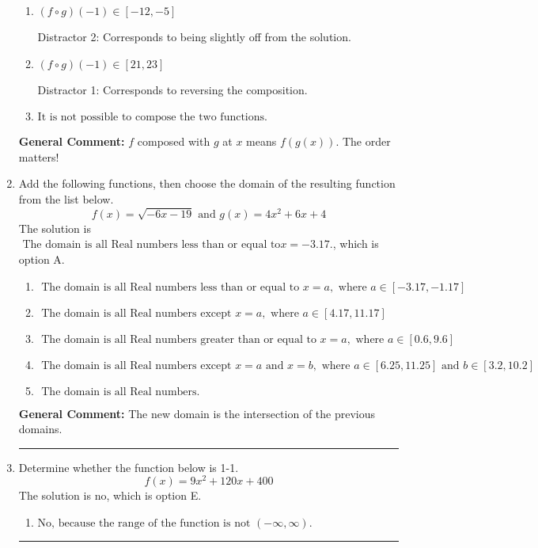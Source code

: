 \documentclass{extbook}[14pt]
\newcommand{\litem}[1]{\item #1

\rule{\textwidth}{0.4pt}}
\begin{document}
\begin{enumerate}
{\begin{enumerate}[label=\Alph*.]
* This is the correct solution
\item \( (f \circ g)(-1) \in [-12, -5] \)

 Distractor 2: Corresponds to being slightly off from the solution.
\item \( (f \circ g)(-1) \in [21, 23] \)

 Distractor 1: Corresponds to reversing the composition.
\item \( \text{It is not possible to compose the two functions.} \)


\end{enumerate}

\textbf{General Comment:} $f$ composed with $g$ at $x$ means $f(g(x))$. The order matters!
}
\litem{
Add the following functions, then choose the domain of the resulting function from the list below.
\[ f(x) = \sqrt{-6x-19}  \text{ and } g(x) = 4x^{2} +6 x + 4 \]The solution is \( \text{ The domain is all Real numbers less than or equal to} x = -3.17. \), which is option A.\begin{enumerate}[label=\Alph*.]
\item \( \text{ The domain is all Real numbers less than or equal to } x = a, \text{ where } a \in [-3.17, -1.17] \)


\item \( \text{ The domain is all Real numbers except } x = a, \text{ where } a \in [4.17, 11.17] \)


\item \( \text{ The domain is all Real numbers greater than or equal to } x = a, \text{ where } a \in [0.6, 9.6] \)


\item \( \text{ The domain is all Real numbers except } x = a \text{ and } x = b, \text{ where } a \in [6.25, 11.25] \text{ and } b \in [3.2, 10.2] \)


\item \( \text{ The domain is all Real numbers. } \)


\end{enumerate}

\textbf{General Comment:} The new domain is the intersection of the previous domains.
}
\litem{
Determine whether the function below is 1-1.
\[ f(x) = 9 x^2 + 120 x + 400 \]The solution is \( \text{no} \), which is option E.\begin{enumerate}[label=\Alph*.]
\item \( \text{No, because the range of the function is not $(-\infty, \infty)$.} \)


\end{enumerate}}
\end{enumerate}
\end{document}
